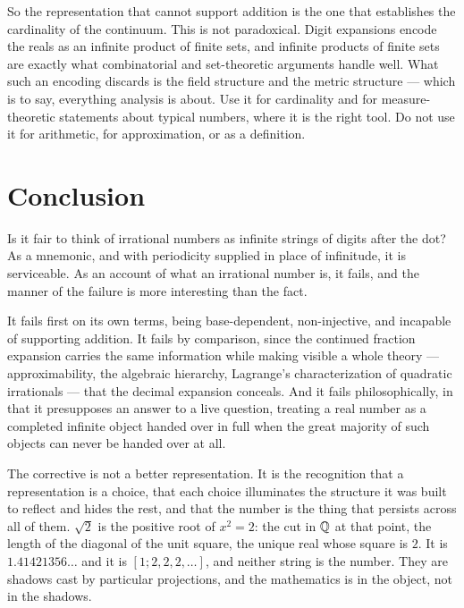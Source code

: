 \documentclass{essay}
\begin{document}
So the representation that cannot support addition is the one that establishes
the cardinality of the continuum. This is not paradoxical. Digit expansions
encode the reals as an infinite product of finite sets, and infinite products of
finite sets are exactly what combinatorial and set-theoretic arguments handle
well. What such an encoding discards is the field structure and the metric
structure --- which is to say, everything analysis is about. Use it for
cardinality and for measure-theoretic statements about typical numbers, where it
is the right tool. Do not use it for arithmetic, for approximation, or as a
definition.

\section{Conclusion}

Is it fair to think of irrational numbers as infinite strings of digits after
the dot? As a mnemonic, and with periodicity supplied in place of infinitude, it
is serviceable. As an account of what an irrational number is, it fails, and the
manner of the failure is more interesting than the fact.

It fails first on its own terms, being base-dependent, non-injective, and
incapable of supporting addition. It fails by comparison, since the continued
fraction expansion carries the same information while making visible a whole
theory --- approximability, the algebraic hierarchy, Lagrange's characterization
of quadratic irrationals --- that the decimal expansion conceals. And it fails
philosophically, in that it presupposes an answer to a live question, treating a
real number as a completed infinite object handed over in full when the great
majority of such objects can never be handed over at all.

The corrective is not a better representation. It is the recognition that a
representation is a choice, that each choice illuminates the structure it was
built to reflect and hides the rest, and that the number is the thing that
persists across all of them. $\sqrt2$ is the positive root of $x^2 = 2$: the
cut in $\mathbb{Q}$ at that point, the length of the diagonal of the unit square, the
unique real whose square is $2$. It is $1.41421356\ldots$ and it is
$[1;2,2,2,\ldots]$, and neither string is the number. They are shadows cast by
particular projections, and the mathematics is in the object, not in the
shadows.
\end{document}

